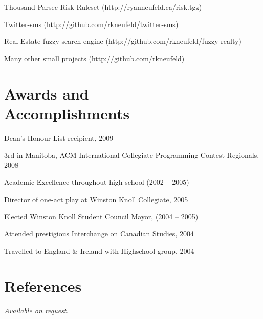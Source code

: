 \documentclass[margin,line,letterpaper]{resume}
\begin{document}
\begin{resume}
  \begin{list2}
    \item Thousand Parsec Risk Ruleset (http://ryanneufeld.ca/risk.tgz)
    \item Twitter-sms (http://github.com/rkneufeld/twitter-sms)
    \item Real Estate fuzzy-search engine (http://github.com/rkneufeld/fuzzy-realty)
    \item Many other small projects (http://github.com/rkneufeld)
  \end{list2}


  \section{\mysidestyle Awards and\\Accomplishments}

  \begin{list2}
    \item Dean's Honour List recipient, 2009
    \item 3rd in Manitoba, ACM International Collegiate Programming Contest Regionals, 2008
    \item Academic Excellence throughout high school (2002 -- 2005)
    \item Director of one-act play at Winston Knoll Collegiate, 2005
    \item Elected Winston Knoll Student Council Mayor, (2004 -- 2005)
    \item Attended prestigious Interchange on Canadian Studies, 2004
    \item Travelled to England \& Ireland with Highschool group, 2004
  \end{list2}

  \section{\mysidestyle References}

  {\sl Available on request.}

\end{resume}
\end{document}
